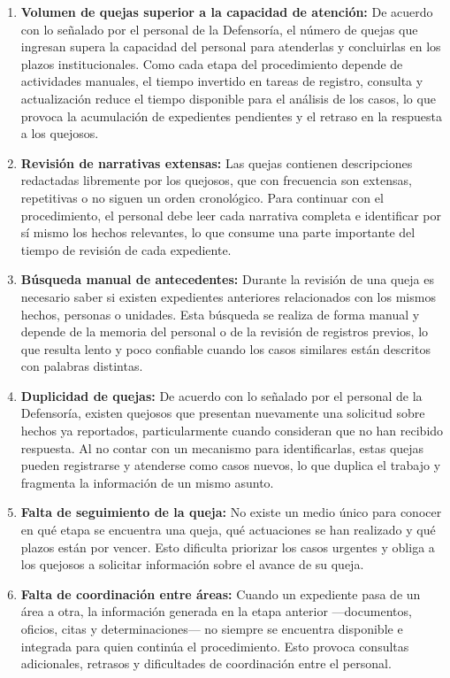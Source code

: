	\begin{enumerate}
		\item \label{pe:volumen}\textbf{Volumen de quejas superior a la capacidad de atención:}
		De acuerdo con lo señalado por el personal de la Defensoría, el número de quejas que ingresan supera la capacidad del personal para atenderlas y concluirlas en los plazos institucionales. Como cada etapa del procedimiento depende de actividades manuales, el tiempo invertido en tareas de registro, consulta y actualización reduce el tiempo disponible para el análisis de los casos, lo que provoca la acumulación de expedientes pendientes y el retraso en la respuesta a los quejosos.

		\item \label{pe:narrativas}\textbf{Revisión de narrativas extensas:}
		Las quejas contienen descripciones redactadas libremente por los quejosos, que con frecuencia son extensas, repetitivas o no siguen un orden cronológico. Para continuar con el procedimiento, el personal debe leer cada narrativa completa e identificar por sí mismo los hechos relevantes, lo que consume una parte importante del tiempo de revisión de cada expediente.

		\item \label{pe:antecedentes}\textbf{Búsqueda manual de antecedentes:}
		Durante la revisión de una queja es necesario saber si existen expedientes anteriores relacionados con los mismos hechos, personas o unidades. Esta búsqueda se realiza de forma manual y depende de la memoria del personal o de la revisión de registros previos, lo que resulta lento y poco confiable cuando los casos similares están descritos con palabras distintas.

		\item \label{pe:duplicadas}\textbf{Duplicidad de quejas:}
		De acuerdo con lo señalado por el personal de la Defensoría, existen quejosos que presentan nuevamente una solicitud sobre hechos ya reportados, particularmente cuando consideran que no han recibido respuesta. Al no contar con un mecanismo para identificarlas, estas quejas pueden registrarse y atenderse como casos nuevos, lo que duplica el trabajo y fragmenta la información de un mismo asunto.

		\item \label{pe:estado}\textbf{Falta de seguimiento de la queja:}
		No existe un medio único para conocer en qué etapa se encuentra una queja, qué actuaciones se han realizado y qué plazos están por vencer. Esto dificulta priorizar los casos urgentes y obliga a los quejosos a solicitar información sobre el avance de su queja.

		\item \label{pe:informacion}\textbf{Falta de coordinación entre áreas:}
		Cuando un expediente pasa de un área a otra, la información generada en la etapa anterior ---documentos, oficios, citas y determinaciones--- no siempre se encuentra disponible e integrada para quien continúa el procedimiento. Esto provoca consultas adicionales, retrasos y dificultades de coordinación entre el personal.

	\end{enumerate}

